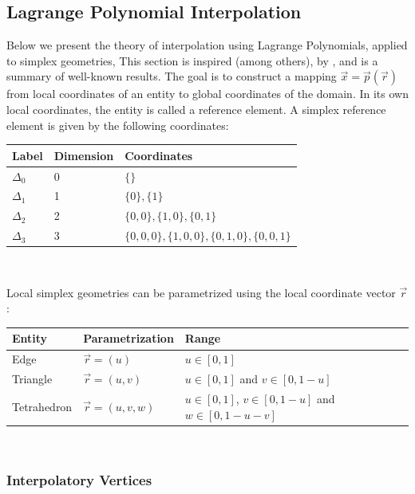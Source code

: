 \subsection{Lagrange Polynomial Interpolation}
\label{theory-lagrange}

Below we present the theory of interpolation using Lagrange Polynomials, applied to simplex geometries, This section is inspired (among others), by \cite{koshiba+2000, ilic+2003, berrut+2004}, and is a summary of well-known results. The goal is to construct a mapping $\vec{x} = \vec{p}(\vec{r})$ from local coordinates of an entity to global coordinates of the domain. In its own local coordinates, the entity is called \citeDune{} a reference element. A simplex reference element is given by the following coordinates: \\

\noindent
\begin{tabular}{l l l}
\hline
  Label & Dimension & Coordinates \\ \hline
  $\Delta_0$ & 0 & $\{ \}$ \\
  $\Delta_1$ & 1 & $\{ 0\}, \{ 1\}$ \\
  $\Delta_2$ & 2 & $\{ 0, 0 \}, \{ 1, 0 \}, \{ 0, 1 \}$ \\
  $\Delta_3$ & 3 & $\{ 0, 0, 0 \}, \{ 1, 0, 0 \}, \{ 0, 1, 0 \}, \{ 0, 0, 1 \}$ \\
\end{tabular} \\

\vspace{2mm}

\noindent
Local simplex geometries can be parametrized using the local coordinate vector $\vec{r}$: \\

\noindent
\begin{tabular}{l l l}
\hline
  Entity      & Parametrization    & Range \\ \hline
  Edge        & $\vec{r}=(u)$      & $u \in [0,1]$ \\
  Triangle    & $\vec{r}=(u,v)$    & $u \in [0,1]$ and $v \in [0, 1-u]$ \\
  Tetrahedron & $\vec{r}=(u,v,w)$  & $u \in [0,1]$, $v \in [0, 1-u]$ and $w \in [0, 1-u-v]$ \\
\end{tabular} \\

\subsubsection{Interpolatory Vertices}
\label{theory-lagrange-vertices}

